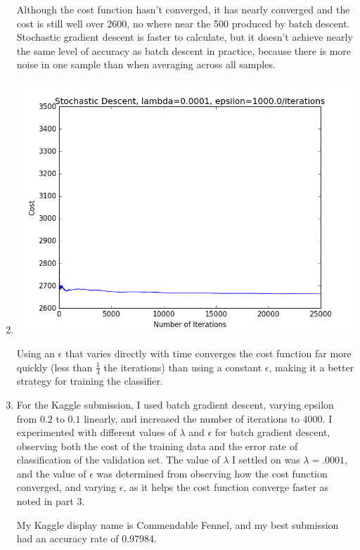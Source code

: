 \documentclass{article}
\begin{document}
\begin{enumerate}[label=\arabic*)]
Although the cost function hasn't converged, it has nearly converged and the cost is still well over 2600, no where near the 500 produced by batch descent. Stochastic gradient descent is faster to calculate, but it doesn't achieve nearly the same level of accuracy as batch descent in practice, because there is more noise in one sample than when averaging across all samples.

\item
\includegraphics[scale=.6]{images/stoch_vary.png}

Using an $\epsilon$ that varies directly with time converges the cost function far more quickly (less than $\frac{1}{4}$ the iterations) than using a constant $\epsilon$, making it a better strategy for training the classifier.

\item
For the Kaggle submission, I used batch gradient descent, varying epsilon from $0.2$ to $0.1$ linearly, and increased the number of iterations to $4000$. I experimented with different values of $\lambda$ and $\epsilon$ for batch gradient descent, observing both the cost of the training data and the error rate of classification of the validation set. The value of $\lambda$ I settled on was $\lambda=.0001$, and the value of $\epsilon$ was determined from observing how the cost function converged, and varying $\epsilon$, as it helps the cost function converge faster as noted in part 3.


My Kaggle display name is Commendable Fennel, and my best submission had an accuracy rate of 0.97984.

\end{enumerate}
\end{document}
